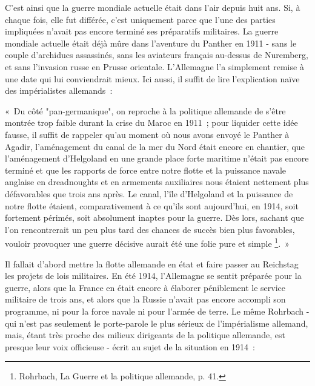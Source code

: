 \documentclass[french,twoside]{book} %
\newenvironment{quoteblock}%
  {\begin{quoting}}
  {\end{quoting}}
\newenvironment{quotebar}{%
    \def\FrameCommand{{\color{rubric!10!}\vrule width 0.5em} \hspace{0.9em}}%
    \def\OuterFrameSep{\itemsep} %
    \MakeFramed {\advance\hsize-\width \FrameRestore}
  }%
  {%
    \endMakeFramed
  }
\renewenvironment{quoteblock}%
  {%
    \savenotes
    \setstretch{0.9}
    \normalfont
    \begin{quotebar}
  }
  {%
    \end{quotebar}
    \spewnotes
  }
\begin{document}
C'est ainsi que la guerre mondiale actuelle était dans l’air depuis huit ans. Si, à chaque fois, elle fut différée, c’est uniquement parce que l’une des parties impliquées n’avait pas encore terminé ses préparatifs militaires. La guerre mondiale actuelle était déjà mûre dans l’aventure du Panther en 1911 - sans le couple d’archiducs assassinés, sans les aviateurs français au-dessus de Nuremberg, et sans l’invasion russe en Prusse orientale. L'Allemagne l’a simplement remise à une date qui lui conviendrait mieux. Ici aussi, il suffit de lire l’explication naïve des impérialistes allemands :\par

\begin{quoteblock}
 \noindent « Du côté "pan-germanique", on reproche à la politique allemande de s’être montrée trop faible durant la crise du Maroc en 1911 ; pour liquider cette idée fausse, il suffit de rappeler qu’au moment où nous avons envoyé le Panther à Agadir, l’aménagement du canal de la mer du Nord était encore en chantier, que l’aménagement d’Helgoland en une grande place forte maritime n’était pas encore terminé et que les rapports de force entre notre flotte et la puissance navale anglaise en dreadnoughts et en armements auxiliaires nous étaient nettement plus défavorables que trois ans après. Le canal, l’île d’Helgoland et la puissance de notre flotte étaient, comparativement à ce qu’ils sont aujourd’hui, en 1914, soit fortement périmés, soit  absolument inaptes pour la guerre. Dès lors, sachant que l’on rencontrerait un peu plus tard des chances de succès bien plus favorables, vouloir provoquer une guerre décisive aurait été une folie pure et simple \footnote{Rohrbach, La Guerre et la politique allemande, p. 41.}. »
\end{quoteblock}

\noindent Il fallait d’abord mettre la flotte allemande en état et faire passer au Reichstag les projets de lois militaires. En été 1914, l’Allemagne se sentit préparée pour la guerre, alors que la France en était encore à élaborer péniblement le service militaire de trois ans, et alors que la Russie n’avait pas encore accompli son programme, ni pour la force navale ni pour l’armée de terre. Le même Rohrbach - qui n’est pas seulement le porte-parole le plus sérieux de l’impérialisme allemand, mais, étant très proche des milieux dirigeants de la politique allemande, est presque leur voix officieuse - écrit au sujet de la situation en 1914 :\par
\end{document}
